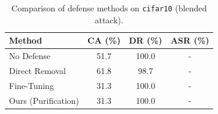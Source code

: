 \begin{table}[htbp]
\centering
\caption{Comparison of defense methods on \texttt{cifar10} (blended attack).}
\label{tab:results}
\begin{tabular}{lccc}
\toprule
Method & CA (\%) & DR (\%) & ASR (\%) \\
\midrule
  No Defense & 51.7 & 100.0 & - \\
  Direct Removal & 61.8 & 98.7 & - \\
  Fine-Tuning & 31.3 & 100.0 & - \\
  Ours (Purification) & 31.3 & 100.0 & - \\
\bottomrule
\end{tabular}
\end{table}